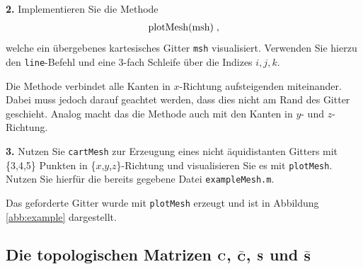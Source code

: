 \documentclass[Protokollheft.tex]{subfiles}
\begin{document}
        \begin{framed}
	\noindent \textbf{2.} Implementieren Sie die Methode
                    \begin{align}
                        \lstinline{plotMesh(msh)} \; ,
                    \end{align}
                    welche ein übergebenes kartesisches Gitter \lstinline{msh} visualisiert. Verwenden
                    Sie hierzu den \lstinline{line}-Befehl und eine 3-fach Schleife über die Indizes $i,j,k$.\label{exer:plotMesh}
\end{framed}
\noindent
Die Methode verbindet alle Kanten in $x$-Richtung aufsteigenden miteinander. Dabei muss jedoch darauf geachtet werden, dass dies nicht am Rand des Gitter geschieht. Analog macht das die Methode auch mit den Kanten in $y$- und $z$-Richtung.
        \begin{framed}
	\noindent \textbf{3.} Nutzen Sie \lstinline{cartMesh} zur Erzeugung eines nicht äquidistanten Gitters mit \{3,4,5\} Punkten in \{$x$,$y$,$z$\}-Richtung und visualisieren Sie es mit \lstinline{plotMesh}. Nutzen Sie hierfür die bereits gegebene Datei \lstinline{exampleMesh.m}.\label{exer:createVisualizeMesh}
\end{framed}
\noindent
Das geforderte Gitter wurde mit \lstinline{plotMesh} erzeugt und ist in Abbildung \ref{abb:example} dargestellt.


%
    {\subsection{Die topologischen Matrizen $\mathbf{C}$, $\widetilde{\mathbf{C}}$, $\mathbf{S}$ und $\widetilde{\mathbf{S}}$}}
\end{document}
